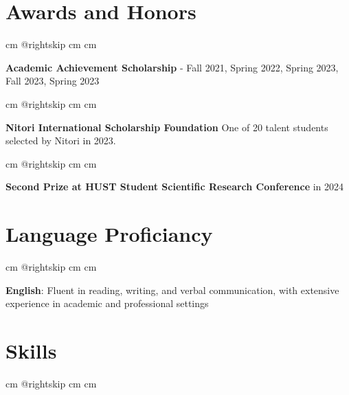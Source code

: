 \documentclass[10pt, letterpaper]{article}
\begin{document}
        \vspace{0.2 cm}

        
    \section{Awards and Honors}

        \begingroup{} cm
        \advance\csname @rightskip cm
        \advance{} cm

        \textbf{Academic Achievement Scholarship} - Fall 2021, Spring 2022, Spring 2023, Fall 2023, Spring 2023  \par\endgroup

        \vspace{0.2 cm}
        \begingroup{} cm
        \advance\csname @rightskip cm
        \advance{} cm

        \textbf{Nitori International Scholarship Foundation} One of 20 talent students selected by Nitori in 2023. \par\endgroup

        \vspace{0.2 cm}
        \begingroup{} cm
        \advance\csname @rightskip cm
        \advance{} cm

        \textbf{Second Prize at HUST Student Scientific Research Conference } in 2024 \par\endgroup
    \newpage %

    \section{Language Proficiancy}

        \begingroup{} cm
        \advance\csname @rightskip cm
        \advance{} cm

        \textbf{English}: Fluent in reading, writing, and verbal communication, with extensive experience in academic and professional settings \par\endgroup

        \vspace{0.2 cm}

    
    \section{Skills}

        \begingroup{} cm
        \advance\csname @rightskip cm
        \advance{} cm
\end{document}
